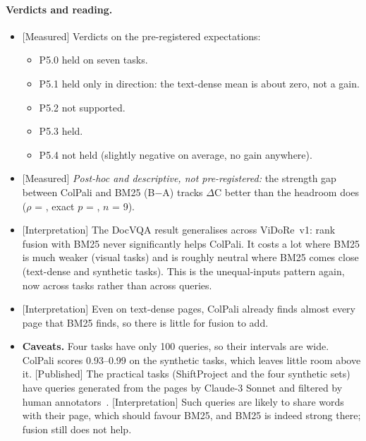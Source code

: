 \documentclass[11pt,a4paper]{article}
\newcommand{\lbl}[2]{\textsf{\scriptsize\textcolor{#1}{[#2]}}}
\newcommand{\Pub}{\lbl{tagP}{Published}}
\newcommand{\Int}{\lbl{tagI}{Interpretation}}
\newcommand{\Mea}{\lbl{tagM}{Measured}}
\begin{document}
\paragraph{Verdicts and reading.}
\begin{itemize}
  \item \Mea{} Verdicts on the pre-registered expectations:
  \begin{itemize}
    \item P5.0 held on seven tasks.
    \item P5.1 held only in direction: the text-dense mean is about zero, not a gain.
    \item P5.2 not supported.
    \item P5.3 held.
    \item P5.4 not held (slightly negative on average, no gain anywhere).
  \end{itemize}
  \item \Mea{} \emph{Post-hoc and descriptive, not pre-registered:} the strength gap between ColPali and BM25 (B$-$A) tracks $\Delta$C better than the headroom does ($\rho$ = \pfGapRho{}, exact $p$ = \pfGapRhoP{}, $n$ = 9).
  \item \Int{} The DocVQA result generalises across ViDoRe~v1: rank fusion with BM25 never significantly helps ColPali. It costs a lot where BM25 is much weaker (visual tasks) and is roughly neutral where BM25 comes close (text-dense and synthetic tasks). This is the unequal-inputs pattern again, now across tasks rather than across queries.
  \item \Int{} Even on text-dense pages, ColPali already finds almost every page that BM25 finds, so there is little for fusion to add.
  \item \textbf{Caveats.} Four tasks have only 100 queries, so their intervals are wide. ColPali scores 0.93--0.99 on the synthetic tasks, which leaves little room above it. \Pub{} The practical tasks (ShiftProject and the four synthetic sets) have queries generated from the pages by Claude-3 Sonnet and filtered by human annotators~\cite[\S3.1, Table~1]{colpali}. \Int{} Such queries are likely to share words with their page, which should favour BM25, and BM25 is indeed strong there; fusion still does not help.
\end{itemize}
\end{document}
